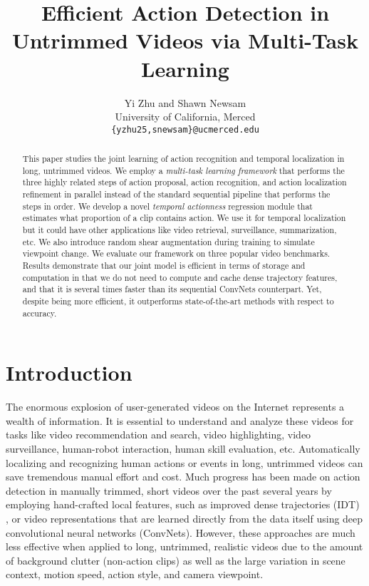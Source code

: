 \documentclass[10pt,twocolumn,letterpaper]{article}
\begin{document}
\title{Efficient Action Detection in Untrimmed Videos via Multi-Task Learning}

\author{Yi Zhu and Shawn Newsam\\
University of California, Merced\\
{\tt\small \{yzhu25,snewsam\}@ucmerced.edu}
}

\maketitle
\ifwacvfinal\thispagestyle{empty}\fi

\begin{abstract}
	This paper studies the joint learning of action recognition and temporal localization in long, untrimmed videos. We employ a \textit{ multi-task learning framework} that performs the three highly related steps of action proposal, action recognition, and action localization refinement in parallel instead of the standard sequential pipeline that performs the steps in order. 
	We develop a novel \textit{temporal actionness} regression module that estimates what proportion of a clip contains action. We use it for temporal localization but it could have other applications like video retrieval, surveillance, summarization, etc. 
	We also introduce random shear augmentation during training to simulate viewpoint change.
	We evaluate our framework on three popular video benchmarks. Results demonstrate that our joint model is efficient in terms of storage and computation in that we do not need to compute and cache dense trajectory features, and that it is several times faster than its sequential ConvNets counterpart. Yet, despite being more efficient, it outperforms state-of-the-art methods with respect to accuracy.
\end{abstract}

\section{Introduction}
\label{sec:intro}
The enormous explosion of user-generated videos on the Internet represents a wealth of information. It is essential to understand and analyze these videos for tasks like video recommendation and search, video highlighting, video surveillance, human-robot interaction, human skill evaluation, etc. Automatically localizing and recognizing human actions or events in long, untrimmed videos can save tremendous manual effort and cost.
Much progress has been made on action detection in manually trimmed, short videos over the past several years \cite{yizhu_depth2action_eccvw_2016,15000object2015,Objects2action_Jain_iccv15,actionLocal_context_Soomro_iccv15,actionLocal_track_Weinzaepfel_iccv15,action_tubes_cvpr15_Gkioxari} by employing hand-crafted local features, such as improved dense trajectories (IDT) \cite{idtfWang2013}, or video representations that are learned directly from the data itself using deep convolutional neural networks (ConvNets). However, these approaches are much less effective when applied to long, untrimmed, realistic videos due to the amount of background clutter (non-action clips) as well as the large variation in scene context, motion speed, action style, and camera viewpoint. 
\end{document}
